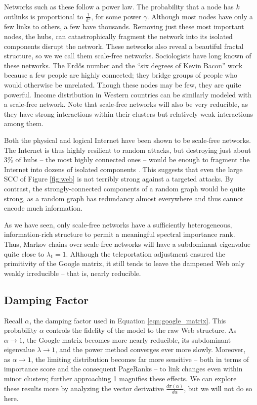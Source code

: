 \documentclass[../exploring-pagerank.tex]{subfiles}
\begin{document}
    Networks such as these follow a power law. The probability that a node has $k$ outlinks is proportional to $\frac{1}{k^\gamma}$, for some power $\gamma$. Although most nodes have only a few links to others, a few have thousands. Removing just these most important nodes, the hubs, can catastrophically fragment the network into its isolated components disrupt the network. These networks also reveal a beautiful fractal structure, so we we call them scale-free networks. Sociologists have long known of these networks. The Erdős number and the ``six degrees of Kevin Bacon'' work because a few people are highly connected; they bridge groups of people who would otherwise be unrelated. Though these nodes may be few, they are quite powerful. Income distribution in Western countries can be similarly modeled with a scale-free network. Note that scale-free networks will also be very reducible, as they have strong interactions within their clusters but relatively weak interactions among them.

    Both the physical and logical Internet have been shown to be scale-free networks. The Internet is thus highly resilient to random attacks, but destroying just about 3\% of hubs -- the most highly connected ones -- would be enough to fragment the Internet into dozens of isolated components \cite{barabasiNetworkScienceScaleFree}. This suggests that even the large SCC of Figure \ref{fig:web} is not terribly strong against a targeted attacks. By contrast, the strongly-connected components of a random graph would be quite strong, as a random graph has redundancy almost everywhere and thus cannot encode much information.

    As we have seen, only scale-free networks have a sufficiently heterogeneous, information-rich structure to permit a meaningful spectral importance rank. Thus, Markov chains over scale-free networks will have a subdominant eigenvalue quite close to $\lambda_1 = 1$. Although the teleportation adjustment ensured the primitivity of the Google matrix, it still tends to leave the dampened Web only weakly irreducible -- that is, nearly reducible.

    \subsection{Damping Factor}
    Recall $\alpha$, the damping factor used in Equation \eqref{eqn:google_matrix}. This probability $\alpha$ controls the fidelity of the model to the raw Web structure. As $\alpha \to 1$, the Google matrix becomes more nearly reducible, its subdominant eigenvalue $\lambda \to 1$, and the power method converges ever more slowly. Moreover, as $\alpha \to 1$, the limiting distribution becomes far more sensitive -- both in terms of importance score and the consequent PageRanks -- to link changes even within minor clusters; further approaching 1 magnifies these effects. We can explore these results more by analyzing the vector derivative $\frac{d\pi(\alpha)}{d\alpha}$, but we will not do so here.
\end{document}
